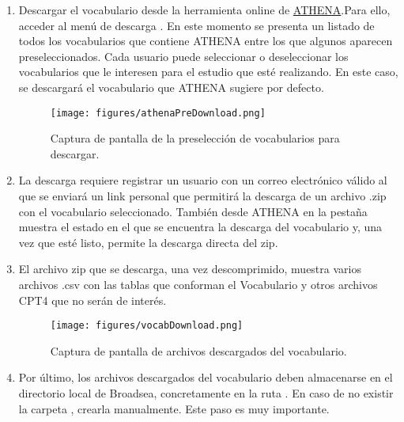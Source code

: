 \begin{enumerate}

    \item Descargar el vocabulario desde la herramienta online de  \href{https://athena.ohdsi.org/}{ATHENA}.Para ello, acceder al menú de descarga . En este momento se presenta un listado de todos los vocabularios que contiene ATHENA entre los que algunos aparecen preseleccionados. Cada usuario puede seleccionar o deseleccionar los vocabularios que le interesen para el estudio que esté realizando. En este caso, se descargará el vocabulario que ATHENA sugiere por defecto.
    
    \begin{figure}[H]
        \centering
        \texttt{[image: figures/athenaPreDownload.png]}
        \caption{Captura de pantalla de la preselección de vocabularios para descargar.}
        \label{fig:athenaPreDownload}
    \end{figure}

    \item La descarga requiere registrar un usuario con un correo electrónico válido al que se enviará un link personal que permitirá la descarga de un archivo .zip con el vocabulario seleccionado. También desde ATHENA en la pestaña  muestra el estado en el que se encuentra la descarga del vocabulario y, una vez que esté listo, permite la descarga directa del zip.

    \item El archivo zip que se descarga, una vez descomprimido, muestra varios archivos .csv con las tablas que conforman el Vocabulario y otros archivos CPT4 que no serán de interés. 

      \begin{figure}[H]
        \centering
        \texttt{[image: figures/vocabDownload.png]}
        \caption{Captura de pantalla de archivos descargados del vocabulario.}
        \label{fig:vocabDownload}
    \end{figure}

    \item Por último, los archivos descargados del vocabulario deben almacenarse en el directorio local de Broadsea, concretamente en la ruta . En caso de no existir la carpeta , crearla manualmente. Este paso es muy importante.

\end{enumerate}

